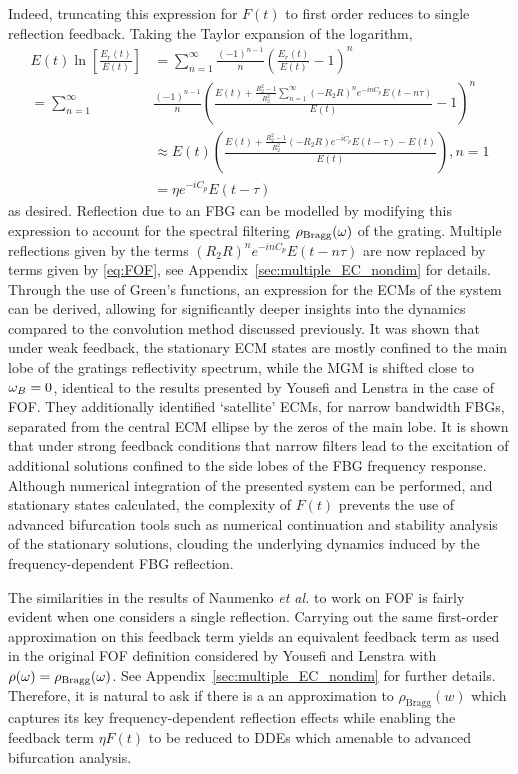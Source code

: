 %
Indeed, truncating this expression for $F(t)$ to first order reduces to single reflection feedback. Taking the Taylor expansion of the logarithm,
%
\begin{equation*}
    \begin{aligned}
        E(t) \ln{\left[ \frac{E_r(t)}{E(t)} \right]} &= \sum_{n=1}^\infty \frac{(-1)^{n-1}}{n}\left( \frac{E_r(t)}{E(t)} - 1\right)^n \\
        = \sum_{n=1}^\infty &\frac{(-1)^{n-1}}{n}\left( \frac{E(t) + \frac{R_2^2 - 1}{R_2^2} \sum_{n=1}^\infty (-R_2 R)^n e^{-i n C_p} E(t-n \tau)}{E(t)} - 1\right)^n\\
        &\approx E(t)\left( \frac{E(t) + \frac{R_2^2 - 1}{R_2^2}(-R_2 R)e^{-i C_p} E(t - \tau) - E(t)}{E(t)} \right), n=1 \\
        &= \eta e^{-i C_p} E(t - \tau)
    \end{aligned}   
\end{equation*}
%
as desired. Reflection due to an FBG can be modelled by modifying this expression to account for the spectral filtering $\rho_{\text{Bragg}}(\omega)$ of the grating. Multiple reflections given by the terms $(R_2 R)^n e^{-i n C_p} E(t-n \tau)$ are now replaced by terms given by \eqref{eq:FOF}, see Appendix~\ref{sec:multiple_EC_nondim} for details. Through the use of Green's functions, an expression for the ECMs of the system can be derived, allowing for significantly deeper insights into the dynamics compared to the convolution method discussed previously. It was shown that under weak feedback, the stationary ECM states are mostly confined to the main lobe of the gratings reflectivity spectrum, while the MGM is shifted close to $\omega_B=0$, identical to the results presented by Yousefi and Lenstra in the case of FOF. They additionally identified `satellite' ECMs, for narrow bandwidth FBGs, separated from the central ECM ellipse by the zeros of the main lobe. It is shown that under strong feedback conditions that narrow filters lead to the excitation of additional solutions confined to the side lobes of the FBG frequency response. Although numerical integration of the presented system can be performed, and stationary states calculated, the complexity of $F(t)$ prevents the use of advanced bifurcation tools such as numerical continuation and stability analysis of the stationary solutions, clouding the underlying dynamics induced by the frequency-dependent FBG reflection. 
%
\par
%
The similarities in the results of Naumenko \textit{et al.} to work on FOF is fairly evident when one considers a single reflection. Carrying out the same first-order approximation on this feedback term yields an equivalent feedback term as used in the original FOF definition considered by Yousefi and Lenstra with $\rho(\omega) = \rho_\text{Bragg}(\omega)$. See Appendix~\ref{sec:multiple_EC_nondim} for further details. Therefore, it is natural to ask if there is a an approximation to $\rho_\text{Bragg}(w)$ which captures its key frequency-dependent reflection effects while enabling the feedback term $\eta F(t)$ to be reduced to DDEs which amenable to advanced bifurcation analysis.